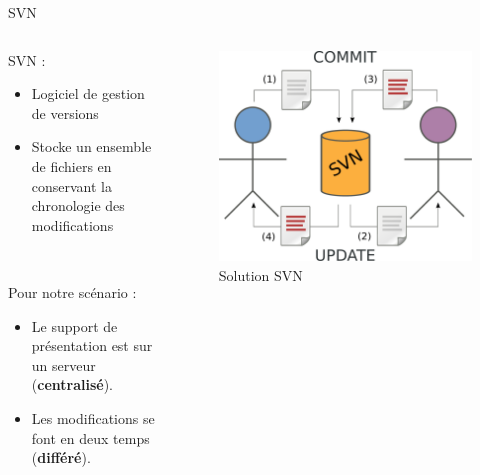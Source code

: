\begin{frame}{SVN}
\begin{columns}
  \begin{column}{.5\textwidth}
  SVN :
  \begin{itemize}
    \item Logiciel de gestion de versions
    \item Stocke un ensemble de fichiers en conservant la chronologie des
    modifications 
  \end{itemize}~

  Pour notre scénario :
  \begin{itemize}
    \item Le support de présentation est sur un serveur (\textbf{centralisé}).
    \item Les modifications se font en deux temps (\textbf{différé}).
  \end{itemize}
  \end{column}

  \begin{column}{.45\textwidth}
  \begin{figure}
    \center
    \includegraphics[width=.9\textwidth]{includes/svn.pdf}
    \caption{Solution SVN}
  \end{figure}
  \end{column}
\end{columns}
\end{frame}

